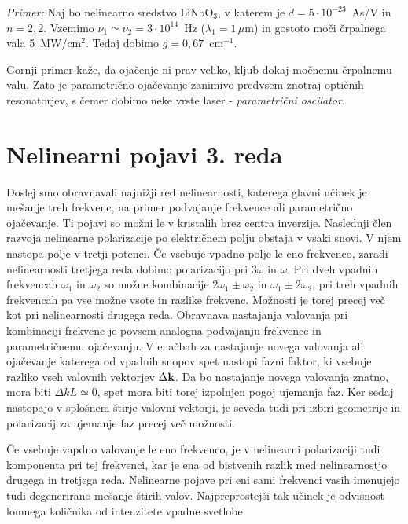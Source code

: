 \documentclass[11pt,fleqn]{book} %
\begin{document}
\textit{Primer:} Naj bo nelinearno sredstvo LiNbO$_{3}$, v katerem
je $d=5\cdot10^{-23}$~As/V in $n=2,2$. Vzemimo $\nu_{1}\simeq\nu_{2}=3\cdot10^{14}$~Hz
($\lambda_{1}=1\,\mu$m) in gostoto moči črpalnega vala 5~MW/cm$^{2}$.
Tedaj dobimo $g=0,67$~cm$^{-1}$.

Gornji primer kaže, da ojačenje ni prav veliko, kljub dokaj močnemu
črpalnemu valu. Zato je parametrično ojačevanje zanimivo predvsem
znotraj optičnih resonatorjev, s čemer dobimo neke vrste laser - \textit{parametrični
oscilator}.


\section{Nelinearni pojavi 3. reda}

Doslej smo obravnavali najnižji red nelinearnosti, katerega glavni
učinek je mešanje treh frekvenc, na primer podvajanje frekvence ali
parametrično ojačevanje. Ti pojavi so možni le v kristalih brez centra
inverzije. Naslednji člen razvoja nelinearne polarizacije po električnem
polju obstaja v vsaki snovi. V njem nastopa polje v tretji potenci.
Če vsebuje vpadno polje le eno frekvenco, zaradi nelinearnosti tretjega
reda dobimo polarizacijo pri 3$\omega$ in $\omega$. Pri dveh vpadnih
frekvencah $\omega_{1}$ in $\omega_{2}$ so možne kombinacije $2\omega_{1}\pm\omega_{2}$
in $\omega_{1}\pm2\omega_{2}$, pri treh vpadnih frekvencah pa vse
možne vsote in razlike frekvenc. Možnosti je torej precej več kot
pri nelinearnosti drugega reda. Obravnava nastajanja valovanja pri
kombinaciji frekvenc je povsem analogna podvajanju frekvence in parametričnemu
ojačevanju. V enačbah za nastajanje novega valovanja ali ojačevanje
katerega od vpadnih snopov spet nastopi fazni faktor, ki vsebuje razliko
vseh valovnih vektorjev $\Delta{\bf k}$. Da bo nastajanje novega
valovanja znatno, mora biti $\Delta kL\simeq0$, spet mora biti torej
izpolnjen pogoj ujemanja faz. Ker sedaj nastopajo v splošnem štirje
valovni vektorji, je seveda tudi pri izbiri geometrije in polarizacij
za ujemanje faz precej več možnosti.

Če vsebuje vapdno valovanje le eno frekvenco, je v nelinearni polarizaciji
tudi komponenta pri tej frekvenci, kar je ena od bistvenih razlik
med nelinearnostjo drugega in tretjega reda. Nelinearne pojave pri
eni sami frekvenci v\textquotedbl{}asih imenujejo tudi degenerirano
mešanje štirih valov. Najpreprostejši tak učinek je odvisnost lomnega
količnika od intenzitete vpadne svetlobe.
\end{document}
